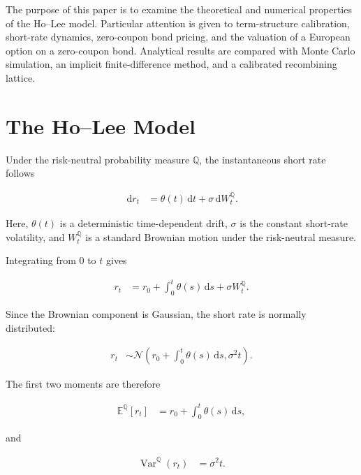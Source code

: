 \documentclass[11pt,a4paper]{article}
\newcommand{\E}{\mathbb{E}}
\newcommand{\Q}{\mathbb{Q}}
\newcommand{\Var}{\operatorname{Var}}
\newcommand{\dd}{\,\mathrm{d}}
\numberwithin{equation}{section}
\begin{document}
The purpose of this paper is to examine the theoretical and numerical
properties of the Ho--Lee model. Particular attention is given to
term-structure calibration, short-rate dynamics, zero-coupon bond pricing,
and the valuation of a European option on a zero-coupon bond. Analytical
results are compared with Monte Carlo simulation, an implicit
finite-difference method, and a calibrated recombining lattice.


\section{The Ho--Lee Model}

Under the risk-neutral probability measure $\Q$, the instantaneous
short rate follows

\begin{align}
    \dd r_t
    &=
    \theta(t)\dd t
    +
    \sigma\dd W_t^{\Q}.
    \label{eq:ho_lee_sde}
\end{align}

Here, $\theta(t)$ is a deterministic time-dependent drift, $\sigma$ is
the constant short-rate volatility, and $W_t^{\Q}$ is a standard
Brownian motion under the risk-neutral measure.

Integrating  from $0$ to $t$ gives

\begin{align*}
    r_t
    &=
    r_0
    +
    \int_0^t \theta(s)\dd s
    +
    \sigma W_t^{\Q}.
\end{align*}

Since the Brownian component is Gaussian, the short rate is normally
distributed:

\begin{align*}
    r_t
    &\sim
    \mathcal{N}
    \left(
        r_0+\int_0^t\theta(s)\dd s,
        \sigma^2t
    \right).
\end{align*}

The first two moments are therefore

\begin{align*}
    \E^{\Q}[r_t]
    &=
    r_0+\int_0^t\theta(s)\dd s,
\end{align*}

and

\begin{align}
    \Var^{\Q}(r_t)
    &=
    \sigma^2t.
    \label{eq:ho_lee_variance}
\end{align}
\end{document}
